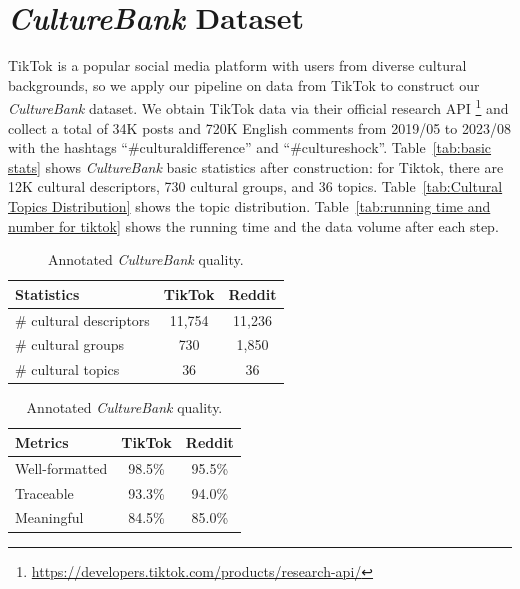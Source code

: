 \documentclass{article} %
\newcommand{\yutong}[1]{\textcolor{orange}{[#1 --Yutong]}}
\newcommand{\dataname}{\textit{CultureBank}\xspace}
\begin{document}
\section{\dataname Dataset}
\label{sec:dataset}
\vspace{-1em}
TikTok is a popular social media platform with users from diverse cultural backgrounds, so we apply our pipeline on data from TikTok to construct our \dataname dataset. We obtain TikTok data via their official research API \footnote{\url{https://developers.tiktok.com/products/research-api/}} and collect a total of 34K %
posts and  
720K %
English comments from 2019/05 to 2023/08 with the hashtags ``\#culturaldifference'' and ``\#cultureshock''. %
Table~\ref{tab:basic stats} shows \dataname basic statistics after construction: for Tiktok, there are 12K cultural descriptors, 730 cultural groups, and 36 topics. Table~\ref{tab:Cultural Topics Distribution} shows the topic distribution. Table~\ref{tab:running time and number for tiktok} shows the running time and the data volume after each step.  %

 \begin{table}[htbp]
\centering
\begin{minipage}[t]{0.45\textwidth} %
\centering
\begin{tabular}{lcc}
\toprule
\textbf{Statistics} & \textbf{TikTok} & \textbf{Reddit} \\
\midrule
\# cultural descriptors & 11,754 & 11,236 \\
\midrule
\# cultural groups & 730 & 1,850 \\
\midrule
\# cultural topics & 36 & 36 \\
\bottomrule
\end{tabular}
\caption{\dataname basic statistics.}
\label{tab:basic stats}
\end{minipage}
\hfill %
\begin{minipage}[t]{0.45\textwidth} %
\centering
\begin{tabular}{lcc}
\toprule
\textbf{Metrics} & \textbf{TikTok} & \textbf{Reddit} \\
\midrule
Well-formatted & 98.5\%&95.5\% \\
\midrule
Traceable & 93.3\%&94.0\% \\
\midrule
Meaningful & 84.5\% & 85.0\% \\
\bottomrule
\end{tabular}
\caption{Annotated \dataname quality. %
}
\label{tab:manual annotation}
\end{minipage}
\end{table}
\end{document}
